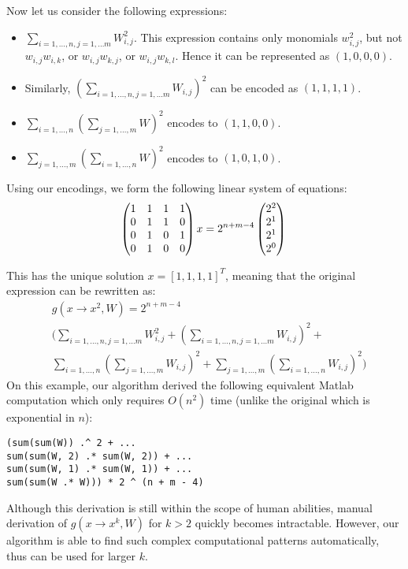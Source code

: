 Now let us consider the following expressions: 
\begin{itemize}
 \item $\sum_{i = 1, \dots, n, j = 1, \dots m} W_{i, j}^2$. 
This expression contains only monomials $w_{i, j}^2$, but not $w_{i,
  j} w_{i, k}$, or $w_{i, j} w_{k, j}$, or $w_{i, j} w_{k, l}$. Hence it can be represented as $(1, 0, 0, 0)$.
 \item Similarly, $(\sum_{i = 1, \dots, n, j = 1, \dots m} W_{i,
     j})^2$ can be encoded as $(1, 1, 1, 1)$.
 \item $\sum_{i = 1, \dots, n}(\sum_{j = 1, \dots, m} W)^2$ encodes to
   $(1, 1, 0, 0)$. 
 \item $\sum_{j = 1, \dots, m}(\sum_{i = 1, \dots, n} W)^2$ encodes to
   $(1, 0, 1, 0)$.
\end{itemize}
 
Using our encodings, we form the following linear system of equations:
 \begin{equation}
 \begin{pmatrix} 
  1 & 1 & 1 & 1 \\ 
  0 & 1 & 1 & 0 \\ 
  0 & 1 & 0 & 1 \\ 
  0 & 1 & 0 & 0 \\     
\end{pmatrix}x = 2^{n + m - 4}\begin{pmatrix} 
  2^{2}\\ 
  2^{1}\\ 
  2^{1}\\ 
  2^{0}\\     
\end{pmatrix} \\
 \end{equation}

This has the unique solution $x=[1, 1, 1, 1]^T$, meaning that the original expression can be
rewritten as: 
\begin{align*}
	&g(x \rightarrow x^2, W) = 2^{n + m - 4} \\ 
 &\Big(\sum_{i = 1, \dots, n, j = 1, \dots m} W_{i, j}^2 + (\sum_{i = 1, \dots, n, j = 1, \dots m} W_{i, j})^2 + \\
 &\sum_{i = 1, \dots, n}(\sum_{j = 1, \dots, m} W_{i, j})^2 + \sum_{j = 1, \dots, m}(\sum_{i = 1, \dots, n} W_{i, j})^2 \Big)
\end{align*}
On this example, our algorithm derived the following equivalent Matlab
computation which only requires $O(n^2)$ time (unlike the original
which is exponential in $n$):
\begin{lstlisting}
(sum(sum(W)) .^ 2 + ...
sum(sum(W, 2) .* sum(W, 2)) + ... 
sum(sum(W, 1) .* sum(W, 1)) + ... 
sum(sum(W .* W))) * 2 ^ (n + m - 4)
\end{lstlisting}
Although this derivation is still within the scope of human abilities, manual derivation
of $g(x \rightarrow x^k, W)$ for $k > 2$ quickly becomes
intractable. However, our algorithm is able to find such complex
computational patterns automatically, thus can be used for larger $k$. 

